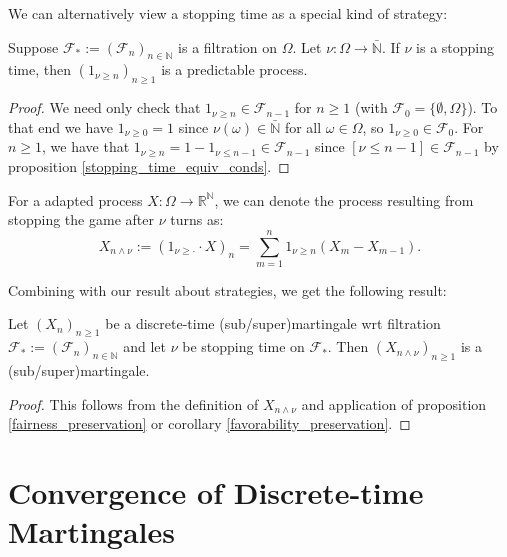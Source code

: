 We can alternatively view a stopping time as a special kind of strategy:

\begin{proposition}
    Suppose $\mathcal{F}_{*} := (\mathcal{F}_{n})_{n \in \mathbb{N}}$ is a filtration on $\Omega$. Let $\nu : \Omega \to \bar{\mathbb{N}}$. If \(\nu\) is a stopping time, then \((1_{\nu \geq n})_{n \geq 1}\) is a predictable process.
\end{proposition}

\begin{proof}
    We need only check that \(1_{\nu \geq n} \in \mathcal{F}_{n-1}\) for \(n \geq 1\) (with \(\mathcal{F}_{0} = \{\emptyset, \Omega\}\)). To that end we have \(1_{\nu \geq 0} = 1\) since \(\nu(\omega) \in \bar{\mathbb{N}}\) for all \(\omega \in \Omega\), so \(1_{\nu \geq 0} \in \mathcal{F}_{0}\). For \(n \geq 1\), we have that \(1_{\nu \geq n} = 1 - 1_{\nu \leq n-1} \in \mathcal{F}_{n-1}\) since \([\nu \leq n-1] \in \mathcal{F}_{n-1}\) by proposition \ref{stopping_time_equiv_conds}.
\end{proof}

For a adapted process $X: \Omega \to \mathbb{R}^{\mathbb{N}}$, we can denote the process resulting from stopping the game after \(\nu\) turns as:
\[X_{n \wedge \nu} := (1_{\nu \geq \cdot} \cdot X)_{n} = \sum\limits_{m=1}^{n} 1_{\nu \geq n} (X_{m} - X_{m-1}).\]

Combining with our result about strategies, we get the following result:

\begin{corollary}
    Let $(X_{n})_{n \geq 1}$ be a discrete-time (sub/super)martingale wrt filtration $\mathcal{F}_{*} := (\mathcal{F}_{n})_{n \in \mathbb{N}}$ and let \(\nu\) be stopping time on \(\mathcal{F}_{*}\). Then \((X_{n \wedge \nu})_{n \geq 1}\) is a (sub/super)martingale.
\end{corollary}

\begin{proof}
    This follows from the definition of \(X_{n \wedge \nu}\) and application of proposition \ref{fairness_preservation} or corollary \ref{favorability_preservation}.
\end{proof}


\section{Convergence of Discrete-time Martingales}

